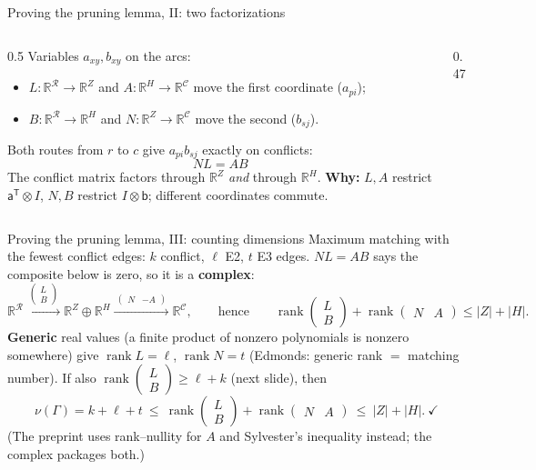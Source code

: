 \documentclass[aspectratio=169,11pt]{beamer}
\newcommand{\abs}[1]{\lvert #1\rvert}
\newcommand{\RR}{\mathbb R}
\newcommand{\Rf}{\mathcal R}
\newcommand{\Cf}{\mathcal C}
\newcommand{\LB}{\left(\begin{smallmatrix}L\\ B\end{smallmatrix}\right)}
\newcommand{\NA}{\left(\begin{smallmatrix}N & A\end{smallmatrix}\right)}
\newcommand{\NmA}{\left(\begin{smallmatrix}N & -A\end{smallmatrix}\right)}
\DeclareMathOperator{\rank}{rank}
\begin{document}
\begin{frame}{Proving the pruning lemma, II: two factorizations}
\begin{columns}[c]
\begin{column}{0.5\textwidth}
Variables $a_{xy},b_{xy}$ on the arcs:
\begin{itemize}
\item $L:\RR^{\Rf}\!\to\RR^Z$ and $A:\RR^H\!\to\RR^{\Cf}$ move the first coordinate ($a_{pi}$);
\item $B:\RR^{\Rf}\!\to\RR^H$ and $N:\RR^Z\!\to\RR^{\Cf}$ move the second ($b_{sj}$).
\end{itemize}
Both routes from $r$ to $c$ give $a_{pi}b_{sj}$ exactly on conflicts:
\[\boxed{\ NL=AB\ }\]
The conflict matrix factors through $\RR^Z$ \emph{and} through $\RR^H$.
{\small\textbf{Why:} $L,A$ restrict $\mathsf a^{\mathsf T}\otimes I$, $N,B$ restrict
$I\otimes\mathsf b$; different coordinates commute.}
\end{column}
\begin{column}{0.47\textwidth}
\centering
{}
\end{column}
\end{columns}
\end{frame}

\begin{frame}{Proving the pruning lemma, III: counting dimensions}
Maximum matching with the fewest conflict edges: $k$ conflict, $\ell$ E2, $t$ E3 edges.
$NL=AB$ says the composite below is zero, so it is a \textbf{complex}:
\[
 \RR^{\Rf}\xrightarrow{\ \LB\ }\RR^{Z}\oplus\RR^{H}\xrightarrow{\ \NmA\ }\RR^{\Cf},
 \qquad\text{hence}\qquad \rank\LB+\rank\NA\le\abs Z+\abs H .
\]
\textbf{Generic} real values (a finite product of nonzero polynomials is nonzero somewhere) give
$\rank L=\ell$, $\rank N=t$ (Edmonds: generic rank $=$ matching number).
If also $\rank\LB\ge\ell+k$ (next slide), then
\[
 \nu(\Gamma)=k+\ell+t\ \le\ \rank\LB+\rank\NA\ \le\ \abs Z+\abs H.\ \checkmark
\]
{\small (The preprint uses rank--nullity for $A$ and Sylvester's inequality instead; the complex packages both.)}
\end{frame}
\end{document}
